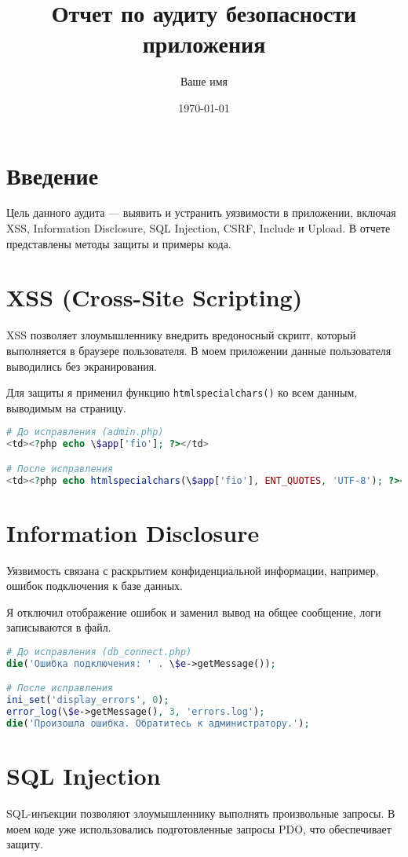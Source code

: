 \documentclass[a4paper,12pt]{article}
\title{Отчет по аудиту безопасности приложения}
\author{Ваше имя}
\date{\today}
\begin{document}
\maketitle

\section*{Введение}
Цель данного аудита — выявить и устранить уязвимости в приложении, включая XSS, Information Disclosure, SQL Injection, CSRF, Include и Upload. В отчете представлены методы защиты и примеры кода.

\section{XSS (Cross-Site Scripting)}
XSS позволяет злоумышленнику внедрить вредоносный скрипт, который выполняется в браузере пользователя. В моем приложении данные пользователя выводились без экранирования.

Для защиты я применил функцию \texttt{htmlspecialchars()} ко всем данным, выводимым на страницу.

\begin{lstlisting}[language=PHP, caption=Защита от XSS]
# До исправления (admin.php)
<td><?php echo \$app['fio']; ?></td>

# После исправления
<td><?php echo htmlspecialchars(\$app['fio'], ENT_QUOTES, 'UTF-8'); ?></td>
\end{lstlisting}

\section{Information Disclosure}
Уязвимость связана с раскрытием конфиденциальной информации, например, ошибок подключения к базе данных.

Я отключил отображение ошибок и заменил вывод на общее сообщение, логи записываются в файл.

\begin{lstlisting}[language=PHP, caption=Защита от Information Disclosure]
# До исправления (db_connect.php)
die('Ошибка подключения: ' . \$e->getMessage());

# После исправления
ini_set('display_errors', 0);
error_log(\$e->getMessage(), 3, 'errors.log');
die('Произошла ошибка. Обратитесь к администратору.');
\end{lstlisting}

\section{SQL Injection}
SQL-инъекции позволяют злоумышленнику выполнять произвольные запросы. В моем коде уже использовались подготовленные запросы PDO, что обеспечивает защиту.
\end{document}
